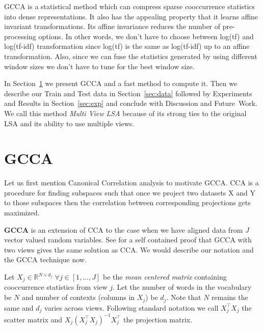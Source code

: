 \documentclass[11pt]{article}
\begin{document}
GCCA is a statistical method which can compress sparse cooccurrence statistics into dense representations.
It also has the appealing property that it
learns affine invariant transformations. Its affine invariance reduces the number of
pre-processing options. In other words, we don't have to choose 
between log(tf) and log(tf-idf) transformation since log(tf) is the
same as log(tf-idf) up to an affine transformation. Also, since we can
fuse the statistics generated by using different window sizes we don't
have to tune for the best window size.

In Section~\ref{sec:gcca} we present GCCA and a fast method to
compute it. Then we describe our Train and Test data in
Section~\ref{sec:data} followed by Experiments and Results in
Section~\ref{sec:exp} and conclude with Discussion and Future~Work. We
call this method \textit{Multi View LSA} because of its strong ties to
the original LSA and its ability to use multiple views.

\section{GCCA}
\label{sec:gcca}
Let us first mention Canonical Correlation analysis to motivate
GCCA. CCA is a procedure for finding subspaces such that once we
project two datasets X and Y to those subspaces then the correlation
between corresponding projections gets
maximized\cite{hotelling1935the}.

\textbf{GCCA} is an extension of CCA to the case when we have aligned data from $J$
vector valued random variables. See \cite{velden2011on} for a self
contained proof that GCCA with two views gives the same solution as
CCA. We would describe our notation and the GCCA technique now.

Let $X_j \in \mathbb{R}^{N\times d_j} \; \forall j \in [1,\ldots,J]$
be the \textit{mean centered matrix} containing cooccurrence statistics from view 
$j$. Let the number of words in the vocabulary be $N$ and number of
contexts (columns in $X_j$) be $d_j$. Note that $N$ remains the same 
and $d_j$ varies across views. Following standard notation
\cite{hastie2009elements} we call $X_j^\top X_j$
the scatter matrix  and $X_j (X_j^\top X_j)^{-1}X_j^\top$ the
projection matrix.
\end{document}
